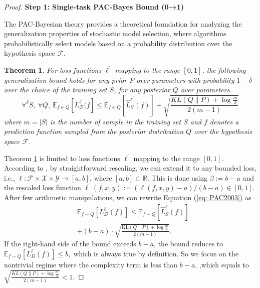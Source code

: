 \documentclass[letterpaper]{article} %
\newtheorem{theorem}{Theorem}
\begin{document}
\begin{proof}
\textbf{Step 1: Single-task PAC-Bayes Bound (0→1)}

The PAC-Bayesian theory provides a theoretical foundation for analyzing the generalization properties of stochastic model selection, where algorithms probabilistically select models based on a probability distribution over the hypothesis space  $\mathcal{F} $. 


\begin{theorem} \label{the: PAC1999}
\citep{mcallesterPACBayesianStochasticModel2003}
For loss functions $\ell^{'}$ mapping to the range $[0,1]$, the following generalization bound holds for any prior $P$ over parameters with probability $1 - \delta$ over the choice of the training set $S$, for any posterior $Q$ over parameters.
\begin{equation}\label{eq: PAC2003}
     \forall^{\delta}S,\ \forall Q,\ \mathbb{E}_{f \in Q}[L_{\mathcal{D}}^{\ell^{'}}(f] \leq  \mathbb{E}_{f \in Q}[\hat{L}^{\ell^{'}}_{S}(f)] +\sqrt{\frac{KL(Q\|P)+\log \frac{m}{\delta}}{2(m-1)}}
\end{equation}
where $m=|S|$ is the number of sample in the training set $S$ and $f$ denotes a prediction function sampled from the posterior distribution $Q$ over the hypothesis space $\mathcal{F}$.
\end{theorem}

Theorem \ref{the: PAC1999} is limited to loss functions $\ell^{'}$ mapping to the range $[0,1]$. According to \citep{germainPACBayesianTheoryMeets2016}, by straightforward rescaling, we can extend it to any bounded loss, i.e., $\ell: \mathcal{F} \times \mathcal{X} \times \mathcal{Y} \rightarrow[a, b]$, where $[a, b] \subset \mathbb{R}$. This is done using $\beta:=b-a$ and the rescaled loss function $\ell^{\prime}(f, x, y):=(\ell(f, x, y)-a) /(b-a) \in[0,1]$. After few arithmetic manipulations, we can rewrite Equation (\ref{eq: PAC2003}) as
\begin{equation}
\begin{aligned}
        &\mathbb{E}_{f \sim Q}[{L}_\mathcal{D}^{\ell}(f)] \leq \mathbb{E}_{f\sim Q}[\widehat{{L}}_S^{\ell}(f)] \\
        &+ (b - a) \cdot \sqrt{\frac{\mathrm{KL}(Q \| P) + \log \frac{m}{\delta}}{2(m - 1)}} .
\end{aligned}
\end{equation}
If the right-hand side of the bound exceeds $b-a$, the bound reduces to
$\mathbb{E}_{f \sim Q}[L_D^{\ell}(f)] \leq b,$
which is always true by definition. So we focus on the nontrivial regime where the complexity term is less than $b-a$, ,which equals to
$\sqrt{\frac{KL(Q\|P)+\log \frac{m}{\delta}}{2(m-1)}} <1. $


\end{proof}
\end{document}
